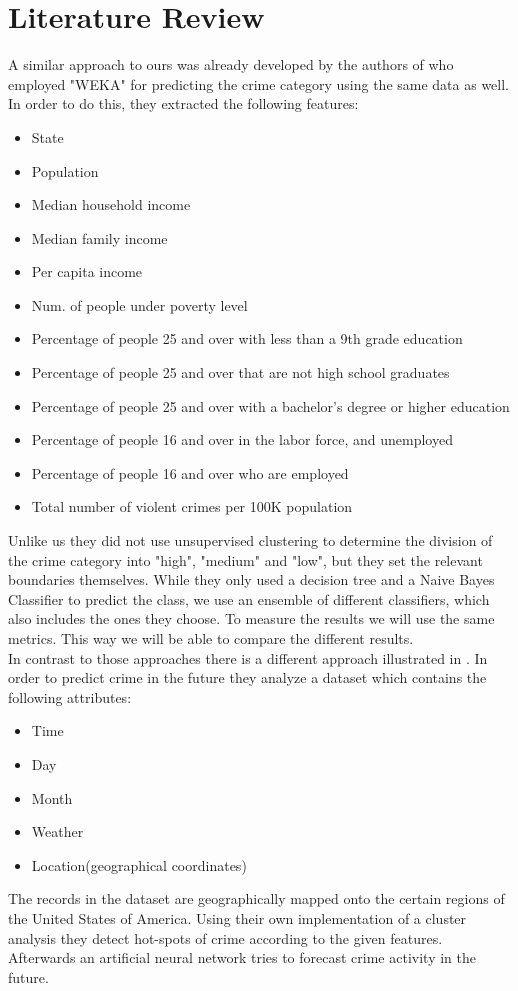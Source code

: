 \section{Literature Review}
A similar approach to ours was already developed by the authors of \cite{indian} who employed "WEKA" for predicting the crime category using the same data as well. In order to do this, they extracted the following features:

\begin{itemize}
	\setlength{\itemsep}{-2pt}
	\item State
	\item Population
	\item Median household income
	\item Median family income
	\item Per capita income
	\item Num. of people under poverty level
	\item Percentage of people 25 and over with less than a 9th grade education
	\item Percentage of people 25 and over that are not high school graduates
	\item Percentage of people 25 and over with a bachelor’s degree or higher education
	\item Percentage of people 16 and over in the labor force, and unemployed
	\item Percentage of people 16 and over who are employed
	\item Total number of violent crimes per 100K population
\end{itemize}

Unlike us they did not use unsupervised clustering to determine the division of the crime category into "high", "medium" and "low", but they set the relevant boundaries themselves. 
While they only used a decision tree and a Naive Bayes Classifier to predict the class, we use an ensemble of different classifiers, which also includes the ones they choose. 
To measure the results we will use the same metrics. This way we will be able to compare the different results. \\


\noindent In contrast to those approaches there is a different approach illustrated in \cite{forecast}. In order to predict crime in the future they analyze a dataset which contains the following attributes:
\begin{itemize}
	\setlength{\itemsep}{-2pt}
	\item Time
	\item Day
	\item Month
	\item Weather
	\item Location(geographical coordinates) 
\end{itemize}
The records in the dataset are geographically mapped onto the certain regions of the United States of America. Using their own implementation of a cluster analysis they detect hot-spots of crime according to the given features. Afterwards an artificial neural network tries to forecast crime activity in the future. 
